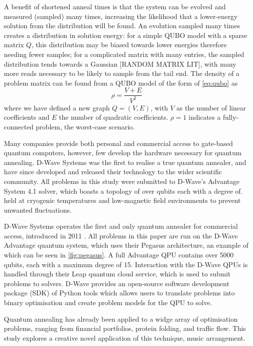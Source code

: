 \documentclass[12pt]{article}
\theoremstyle{definition}
\begin{document}
A benefit of shortened anneal times is that the system can be evolved and measured (sampled) many times, increasing the likelihood that a lower-energy solution from the distribution will be found. An evolution sampled many times creates a distribution in solution energy: for a simple QUBO model with a sparse matrix $Q$, this distribution may be biased towards lower energies therefore needing fewer samples; for a complicated matrix with many entries, the sampled distribution tends towards a Gaussian [RANDOM MATRIX LIT], with many more reads necessary to be likely to sample from the tail end. The density of a problem matrix can be found from a QUBO model of the form of \cref{eq:qubo} as
\begin{equation}
    \rho=\frac{V+E}{V^2}
\end{equation}
where we have defined a new graph $Q=(V,E)$, with $V$ as the number of linear coefficients and $E$ the number of quadratic coefficients. $\rho=1$ indicates a fully-connected problem, the worst-case scenario.

Many companies provide both personal and commercial access to gate-based quantum computers, however, few develop the hardware necessary for quantum annealing. D-Wave Systems was the first to realise a true quantum annealer, and have since developed and released their technology to the wider scientific community. All problems in this study were submitted to D-Wave's Advantage System 4.1 solver, which boasts a topology of over qubits each with a degree of. held at cryogenic temperatures and low-magnetic field environments to prevent unwanted fluctuations.

D-Wave Systems operates the first and only quantum annealer for commercial access, introduced in 2011 . All problems in this paper are run on the D-Wave Advantage quantum system, which uses their Pegasus architecture, an example of which can be seen in \cref{fig:pegasus}. A full Advantage QPU contains over \num{5000} qubits, each with a maximum degree of \num{15}.
Interaction with the D-Wave QPUs is handled through their Leap quantum cloud service, which is used to submit problems to solvers. D-Wave provides an open-source software development package (SDK) of Python tools which allows users to translate problems into binary optimisation and create problem models for the QPU to solve.

Quantum annealing has already been applied to a widge array of optimisation problems, ranging from financial portfolios, protein folding, and traffic flow. This study explores a creative novel application of this technique, music arrangement.
\end{document}
